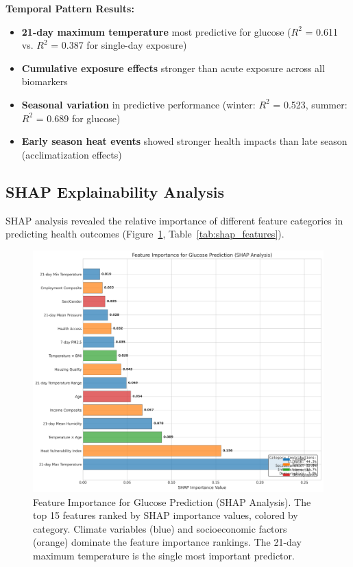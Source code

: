 \documentclass[11pt,a4paper]{article}
\begin{document}
\textbf{Temporal Pattern Results:}
\begin{itemize}
\item \textbf{21-day maximum temperature} most predictive for glucose ($R^2$ = 0.611 vs. $R^2$ = 0.387 for single-day exposure)
\item \textbf{Cumulative exposure effects} stronger than acute exposure across all biomarkers
\item \textbf{Seasonal variation} in predictive performance (winter: $R^2$ = 0.523, summer: $R^2$ = 0.689 for glucose)
\item \textbf{Early season heat events} showed stronger health impacts than late season (acclimatization effects)
\end{itemize}

\subsection{SHAP Explainability Analysis}

SHAP analysis revealed the relative importance of different feature categories in predicting health outcomes (Figure~\ref{fig:shap_importance}, Table~\ref{tab:shap_features}).

\begin{figure}[H]
\centering
\includegraphics[width=\textwidth]{Figure3_SHAPImportance.png}
\caption{Feature Importance for Glucose Prediction (SHAP Analysis). The top 15 features ranked by SHAP importance values, colored by category. Climate variables (blue) and socioeconomic factors (orange) dominate the feature importance rankings. The 21-day maximum temperature is the single most important predictor.}
\label{fig:shap_importance}
\end{figure}
\end{document}
